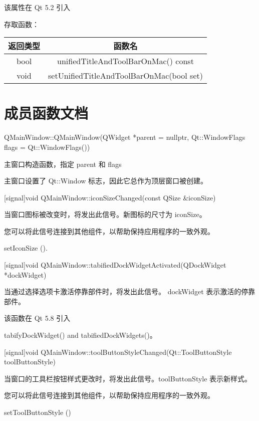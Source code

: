 该属性在 Qt 5.2 引入

存取函数：

\begin{tabular}{|c|c|}
    \hline
    返回类型 &	函数名 \\ 
    \hline  
    bool  &	unifiedTitleAndToolBarOnMac() const \\ 
    \hline
    void  &	setUnifiedTitleAndToolBarOnMac(bool set) \\ 
    \hline
    \end{tabular}

\section{成员函数文档}


QMainWindow::QMainWindow(QWidget *parent = nullptr, Qt::WindowFlags flags = Qt::WindowFlags())

主窗口构造函数，指定 parent 和 flags

主窗口设置了 Qt::Window 标志，因此它总作为顶层窗口被创建。

\splitLine

[signal]void QMainWindow::iconSizeChanged(const QSize \&iconSize)

当窗口图标被改变时，将发出此信号。新图标的尺寸为 iconSize。

您可以将此信号连接到其他组件，以帮助保持应用程序的一致外观。

\begin{seeAlso}
setIconSize ().
\end{seeAlso}

\splitLine

[signal]void QMainWindow::tabifiedDockWidgetActivated(QDockWidget *dockWidget)

当通过选择选项卡激活停靠部件时，将发出此信号。 dockWidget 表示激活的停靠部件。

该函数在 Qt 5.8 引入

\begin{seeAlso}
tabifyDockWidget() and tabifiedDockWidgets()。
\end{seeAlso}

\splitLine

[signal]void QMainWindow::toolButtonStyleChanged(Qt::ToolButtonStyle toolButtonStyle)

当窗口的工具栏按钮样式更改时，将发出此信号。toolButtonStyle 表示新样式。

您可以将此信号连接到其他组件，以帮助保持应用程序的一致外观。

\begin{seeAlso}
setToolButtonStyle ()
\end{seeAlso}

